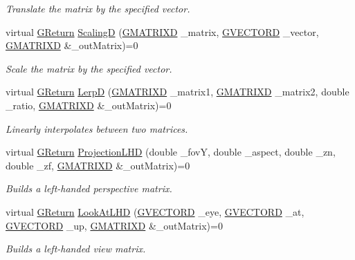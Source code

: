 \begin{DoxyCompactItemize}
\begin{DoxyCompactList}\small\item\em Translate the matrix by the specified vector. \end{DoxyCompactList}\item 
virtual \mbox{\hyperlink{namespaceGW_a67a839e3df7ea8a5c5686613a7a3de21}{G\+Return}} \mbox{\hyperlink{classGW_1_1MATH_1_1GMatrix_adcfdcd010361f3de14661e7d8a54a1dc}{ScalingD}} (\mbox{\hyperlink{structGW_1_1MATH_1_1GMATRIXD}{G\+M\+A\+T\+R\+I\+XD}} \+\_\+matrix, \mbox{\hyperlink{structGW_1_1MATH_1_1GVECTORD}{G\+V\+E\+C\+T\+O\+RD}} \+\_\+vector, \mbox{\hyperlink{structGW_1_1MATH_1_1GMATRIXD}{G\+M\+A\+T\+R\+I\+XD}} \&\+\_\+out\+Matrix)=0
\begin{DoxyCompactList}\small\item\em Scale the matrix by the specified vector. \end{DoxyCompactList}\item 
virtual \mbox{\hyperlink{namespaceGW_a67a839e3df7ea8a5c5686613a7a3de21}{G\+Return}} \mbox{\hyperlink{classGW_1_1MATH_1_1GMatrix_ad53d4038a37cafb207bda974d80009d5}{LerpD}} (\mbox{\hyperlink{structGW_1_1MATH_1_1GMATRIXD}{G\+M\+A\+T\+R\+I\+XD}} \+\_\+matrix1, \mbox{\hyperlink{structGW_1_1MATH_1_1GMATRIXD}{G\+M\+A\+T\+R\+I\+XD}} \+\_\+matrix2, double \+\_\+ratio, \mbox{\hyperlink{structGW_1_1MATH_1_1GMATRIXD}{G\+M\+A\+T\+R\+I\+XD}} \&\+\_\+out\+Matrix)=0
\begin{DoxyCompactList}\small\item\em Linearly interpolates between two matrices. \end{DoxyCompactList}\item 
virtual \mbox{\hyperlink{namespaceGW_a67a839e3df7ea8a5c5686613a7a3de21}{G\+Return}} \mbox{\hyperlink{classGW_1_1MATH_1_1GMatrix_ab22d0d332f4b1d2f1a1f52b2efeebabe}{Projection\+L\+HD}} (double \+\_\+fovY, double \+\_\+aspect, double \+\_\+zn, double \+\_\+zf, \mbox{\hyperlink{structGW_1_1MATH_1_1GMATRIXD}{G\+M\+A\+T\+R\+I\+XD}} \&\+\_\+out\+Matrix)=0
\begin{DoxyCompactList}\small\item\em Builds a left-\/handed perspective matrix. \end{DoxyCompactList}\item 
virtual \mbox{\hyperlink{namespaceGW_a67a839e3df7ea8a5c5686613a7a3de21}{G\+Return}} \mbox{\hyperlink{classGW_1_1MATH_1_1GMatrix_afa59696f30ec1fdaeb503df9b62e4ae2}{Look\+At\+L\+HD}} (\mbox{\hyperlink{structGW_1_1MATH_1_1GVECTORD}{G\+V\+E\+C\+T\+O\+RD}} \+\_\+eye, \mbox{\hyperlink{structGW_1_1MATH_1_1GVECTORD}{G\+V\+E\+C\+T\+O\+RD}} \+\_\+at, \mbox{\hyperlink{structGW_1_1MATH_1_1GVECTORD}{G\+V\+E\+C\+T\+O\+RD}} \+\_\+up, \mbox{\hyperlink{structGW_1_1MATH_1_1GMATRIXD}{G\+M\+A\+T\+R\+I\+XD}} \&\+\_\+out\+Matrix)=0
\begin{DoxyCompactList}\small\item\em Builds a left-\/handed view matrix. \end{DoxyCompactList}\end{DoxyCompactItemize}



